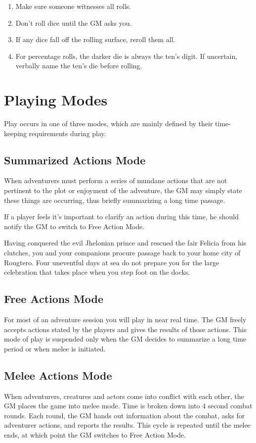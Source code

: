 \begin{enumerate}
\item Make sure someone witnesses all rolls.
\item Don't roll dice until the GM asks you.
\item If any dice fall off the rolling surface, reroll them all.
\item For percentage rolls, the darker die is always the ten's digit. If uncertain, verbally name the ten's die before rolling.
\end{enumerate}
\section{Playing Modes}

Play occurs in one of three modes, which are mainly defined by their time-keeping requirements during play.
\subsection{Summarized Actions Mode}
When adventurers must perform a series of mundane actions that are not pertinent to the plot or  enjoyment of the adventure, the GM may simply state these things are occurring, thus briefly summarizing a long time passage. 

If a player feels it's important to clarify an action during this time, he should notify the GM to switch to Free Action Mode.

Having conquered the evil Jhelonian prince and rescued the fair Felicia from his clutches, you and your companions procure passage back to your home city of Rougtero. Four uneventful days at sea do not prepare you for the large celebration that takes place when you step foot on the docks.
\subsection{Free Actions Mode}

For most of an adventure session you will play in near real time. The GM freely accepts actions stated by the players and gives the results of those actions. This mode of play is suspended only when the GM decides to summarize a long time period or when melee is initiated.
\subsection{Melee Actions Mode}

When adventurers, creatures and actors come into conflict with each other, the GM places the game into melee mode. Time is broken down into 4 second combat rounds. Each round, the GM hands out information about the combat, asks for adventurer actions, and reports the results. This cycle is repeated until the melee ends, at which point the GM switches to Free Action Mode.


